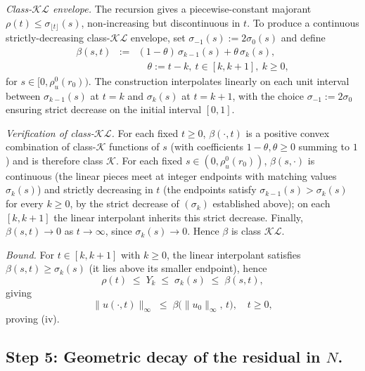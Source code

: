 \documentclass[10pt,a4paper]{amsart}
\begin{document}
\emph{Class-$\mathcal{KL}$ envelope.} The recursion gives a piecewise-constant majorant $\rho(t) \le \sigma_{\lfloor t \rfloor}(s)$, non-increasing but discontinuous in $t$. To produce a continuous strictly-decreasing class-$\mathcal{KL}$ envelope, set $\sigma_{-1}(s) := 2\sigma_0(s)$ and define
\begin{eqnarray}
\beta(s, t) &:=& (1-\theta)\,\sigma_{k-1}(s) + \theta\,\sigma_k(s), \nonumber \\
&& \quad \theta := t - k, \ t \in [k, k+1], \ k \ge 0,
\label{eq:beta_def}
\end{eqnarray}
for $s \in [0, \rho_u^0(r_0))$. The construction interpolates linearly on each unit interval between $\sigma_{k-1}(s)$ at $t = k$ and $\sigma_k(s)$ at $t = k+1$, with the choice $\sigma_{-1} := 2\sigma_0$ ensuring strict decrease on the initial interval $[0, 1]$.

\emph{Verification of class-$\mathcal{KL}$.} For each fixed $t \ge 0$, $\beta(\cdot, t)$ is a positive convex combination of class-$\mathcal{K}$ functions of $s$ (with coefficients $1-\theta, \theta \ge 0$ summing to $1$) and is therefore class $\mathcal{K}$. For each fixed $s \in (0, \rho_u^0(r_0))$, $\beta(s, \cdot)$ is continuous (the linear pieces meet at integer endpoints with matching values $\sigma_k(s)$) and strictly decreasing in $t$ (the endpoints satisfy $\sigma_{k-1}(s) > \sigma_k(s)$ for every $k \ge 0$, by the strict decrease of $(\sigma_k)$ established above); on each $[k, k+1]$ the linear interpolant inherits this strict decrease. Finally, $\beta(s, t) \to 0$ as $t \to \infty$, since $\sigma_k(s) \to 0$. Hence $\beta$ is class $\mathcal{KL}$.

\emph{Bound.} For $t \in [k, k+1]$ with $k \ge 0$, the linear interpolant satisfies $\beta(s, t) \ge \sigma_k(s)$ (it lies above its smaller endpoint), hence
\begin{equation}
\rho(t) \;\le\; Y_k \;\le\; \sigma_k(s) \;\le\; \beta(s, t),
\label{eq:rho_under_beta}
\end{equation}
giving
\begin{equation}
\|u(\cdot, t)\|_\infty \;\le\; \beta\bigl(\|u_0\|_\infty,\, t\bigr), \quad t \ge 0,
\label{eq:KL_assembled}
\end{equation}
proving (iv).

\subsection*{Step 5: Geometric decay of the residual in $N$.}
\end{document}
